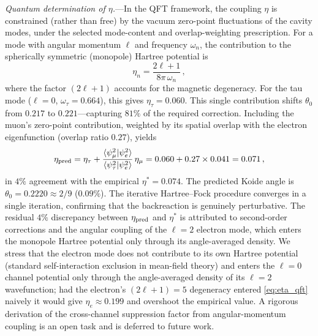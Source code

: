 \documentclass[aps,prd,onecolumn,superscriptaddress,nofootinbib,showpacs,12pt,notitlepage]{revtex4-2}
\begin{document}
\textit{Quantum determination of $\eta$.}---In the QFT
framework, the coupling $\eta$ is constrained (rather than
free) by the vacuum zero-point fluctuations of the cavity
modes, under the selected mode-content and overlap-weighting
prescription.  For a mode with angular momentum
$\ell$ and frequency $\omega_n$, the contribution to
the spherically symmetric (monopole) Hartree potential is
\begin{equation}\label{eq:eta_qft}
  \eta_n = \frac{2\ell + 1}{8\pi\,\omega_n}\,,
\end{equation}
where the factor $(2\ell+1)$ accounts for the magnetic
degeneracy.  For the tau mode ($\ell = 0$,
$\omega_\tau = 0.664$), this gives
$\eta_\tau = 0.060$.  This single contribution shifts
$\theta_0$ from $0.217$ to $0.221$---capturing $81\%$ of
the required correction.  Including the muon's
zero-point contribution, weighted by its spatial overlap
with the electron eigenfunction (overlap ratio $0.27$),
yields
\begin{equation}\label{eq:eta_predicted}
  \eta_{\rm pred} = \eta_\tau
    + \frac{\langle\psi_\mu^{2}|\psi_e^{2}\rangle}
           {\langle\psi_\tau^{2}|\psi_e^{2}\rangle}
    \,\eta_\mu
    = 0.060 + 0.27 \times 0.041
    = 0.071\,,
\end{equation}
in $4\%$ agreement with the empirical $\eta^{*} = 0.074$.
The predicted Koide angle is
$\theta_0 = 0.2220 \approx 2/9$ ($0.09\%$).
The iterative Hartree--Fock procedure converges in a
single iteration, confirming that the backreaction is
genuinely perturbative.  The residual $4\%$ discrepancy
between $\eta_{\rm pred}$ and $\eta^{*}$ is attributed
to second-order corrections and the angular coupling
of the $\ell = 2$ electron mode, which enters the
monopole Hartree potential only through its
angle-averaged density. We stress that the electron
mode does not contribute to its own Hartree potential
(standard self-interaction exclusion in mean-field theory)
and enters the $\ell = 0$ channel potential only through the
angle-averaged density of its $\ell = 2$ wavefunction;
had the electron's $(2\ell+1) = 5$ degeneracy entered
\eqref{eq:eta_qft} naively it would give $\eta_e \approx 0.199$
and overshoot the empirical value. A rigorous derivation of
the cross-channel suppression factor from angular-momentum
coupling is an open task and is deferred to future work.
\end{document}
